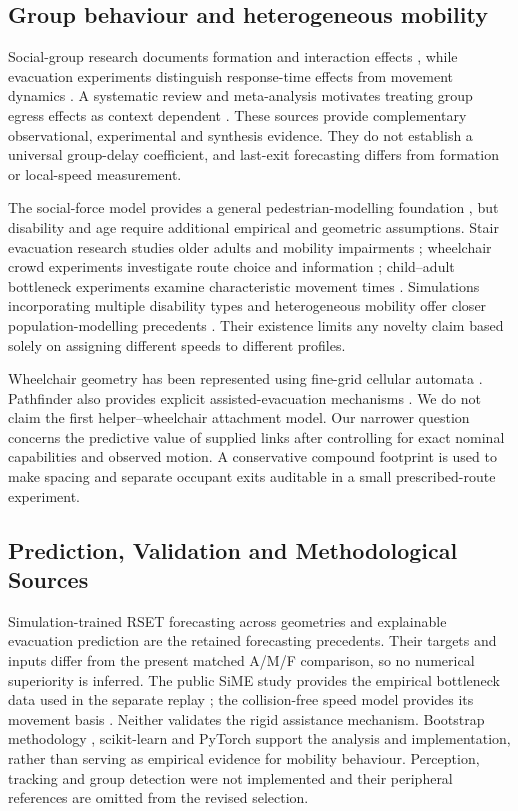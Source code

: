 \documentclass[conference]{IEEEtran}
\begin{document}
\subsection{Group behaviour and heterogeneous mobility}
Social-group research documents formation and interaction effects \cite{r1}, while evacuation experiments distinguish response-time effects from movement dynamics \cite{r2}. A systematic review and meta-analysis motivates treating group egress effects as context dependent \cite{L17}. These sources provide complementary observational, experimental and synthesis evidence. They do not establish a universal group-delay coefficient, and last-exit forecasting differs from formation or local-speed measurement.

The social-force model provides a general pedestrian-modelling foundation \cite{L01}, but disability and age require additional empirical and geometric assumptions. Stair evacuation research studies older adults and mobility impairments \cite{L08}; wheelchair crowd experiments investigate route choice and information \cite{L09}; child--adult bottleneck experiments examine characteristic movement times \cite{L10}. Simulations incorporating multiple disability types and heterogeneous mobility offer closer population-modelling precedents \cite{WU,L14}. Their existence limits any novelty claim based solely on assigning different speeds to different profiles.

Wheelchair geometry has been represented using fine-grid cellular automata \cite{r3}. Pathfinder also provides explicit assisted-evacuation mechanisms \cite{r4}. We do not claim the first helper--wheelchair attachment model. Our narrower question concerns the predictive value of supplied links after controlling for exact nominal capabilities and observed motion. A conservative compound footprint is used to make spacing and separate occupant exits auditable in a small prescribed-route experiment.

\subsection{Prediction, Validation and Methodological Sources}
Simulation-trained RSET forecasting across geometries \cite{r5} and explainable evacuation prediction \cite{L15} are the retained forecasting precedents. Their targets and inputs differ from the present matched A/M/F comparison, so no numerical superiority is inferred. The public SiME study provides the empirical bottleneck data used in the separate replay \cite{SIME}; the collision-free speed model provides its movement basis \cite{CFS}. Neither validates the rigid assistance mechanism. Bootstrap methodology \cite{r6}, scikit-learn \cite{SKLEARN} and PyTorch \cite{TORCH} support the analysis and implementation, rather than serving as empirical evidence for mobility behaviour. Perception, tracking and group detection were not implemented and their peripheral references are omitted from the revised selection.
\end{document}
